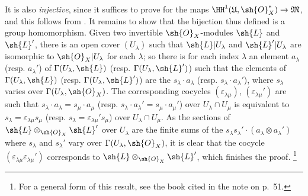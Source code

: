 \begin{env}[5.4.7]
It is also \emph{injective}, since it suffices to prove for the maps $\HH^1(\mathfrak{U},\sh{O}_X^*)\to\mathfrak{M}$, and this follows from .
It remains to show that
the bijection thus defined is a group homomorphism.
Given two invertible $\sh{O}_X$-modules $\sh{L}$ and $\sh{L}'$, there is an open cover $(U_\lambda)$ such that $\sh{L}|U_\lambda$ and $\sh{L}'|U_\lambda$ are isomorphic to $\sh{O}_X|U_\lambda$ for each $\lambda$;
so there is for each index $\lambda$ an element $a_\lambda$ (resp. $a_\lambda'$) of $\Gamma(U_\lambda,\sh{L})$ (resp. $\Gamma(U_\lambda,\sh{L}')$) such that the elements of $\Gamma(U_\lambda,\sh{L})$ (resp. $\Gamma(U_\lambda,\sh{L}')$) are the $s_\lambda\cdot a_\lambda$ (resp. $s_\lambda\cdot a_\lambda'$), where $s_\lambda$ varies over $\Gamma(U_\lambda,\sh{O}_X)$.
The corresponding cocycles $(\varepsilon_{\lambda\mu})$, $(\varepsilon_{\lambda\mu}')$ are such that $s_\lambda\cdot a_\lambda=s_\mu\cdot a_\mu$ (resp. $s_\lambda\cdot a_\lambda'=s_\mu\cdot a_\mu'$) over $U_\lambda\cap U_\mu$ is equivalent to $s_\lambda=\varepsilon_{\lambda\mu}s_\mu$ (resp. $s_\lambda=\varepsilon_{\lambda\mu}' s_\mu$) over $U_\lambda\cap U_\mu$.
As the sections of $\sh{L}\otimes_{\sh{O}_X}\sh{L}'$ over $U_\lambda$ are the finite sums of the $s_\lambda s_\lambda'\cdot(a_\lambda\otimes a_\lambda')$ where $s_\lambda$ and $s_\lambda'$ vary over $\Gamma(U_\lambda,\sh{O}_X)$, it is clear that the cocycle $(\varepsilon_{\lambda\mu}\varepsilon_{\lambda\mu}')$ corresponds to $\sh{L}\otimes_{\sh{O}_X}\sh{L}'$, which finishes the proof.
\footnote{For a general form of this result, see the book cited in the note on p.~51.}
\end{env}

